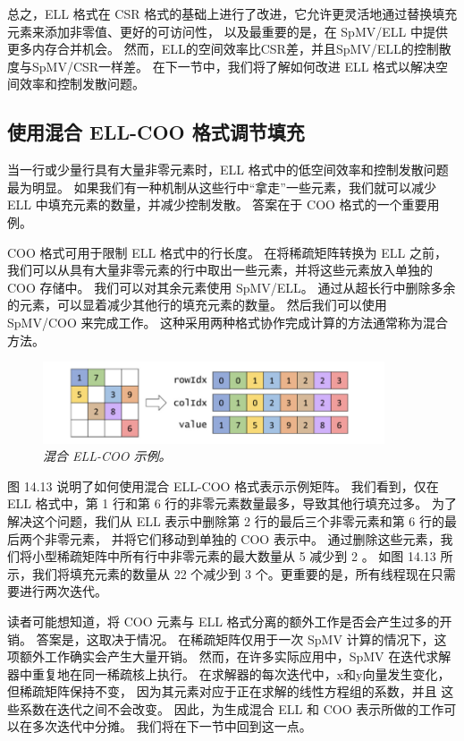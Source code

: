 总之，ELL 格式在 CSR 格式的基础上进行了改进，它允许更灵活地通过替换填充元素来添加非零值、更好的可访问性，
以及最重要的是，在 SpMV/ELL 中提供更多内存合并机会。 
然而，ELL的空间效率比CSR差，并且SpMV/ELL的控制散度与SpMV/CSR一样差。 
在下一节中，我们将了解如何改进 ELL 格式以解决空间效率和控制发散问题。

\subsection{使用混合 ELL-COO 格式调节填充}
当一行或少量行具有大量非零元素时，ELL 格式中的低空间效率和控制发散问题最为明显。 
如果我们有一种机制从这些行中“拿走”一些元素，我们就可以减少 ELL 中填充元素的数量，并减少控制发散。 
答案在于 $\mathrm{COO}$ 格式的一个重要用例。

COO 格式可用于限制 ELL 格式中的行长度。 
在将稀疏矩阵转换为 ELL 之前，我们可以从具有大量非零元素的行中取出一些元素，并将这些元素放入单独的 COO 存储中。 
我们可以对其余元素使用 SpMV/ELL。 通过从超长行中删除多余的元素，可以显着减少其他行的填充元素的数量。 
然后我们可以使用 SpMV/COO 来完成工作。 这种采用两种格式协作完成计算的方法通常称为混合方法。

\begin{figure}[H]
	\centering
	\includegraphics[width=0.9\textwidth]{figs/F14.3.png}
	\caption{\textit{混合 ELL-COO 示例。}}
\end{figure}

图 14.13 说明了如何使用混合 ELL-COO 格式表示示例矩阵。 
我们看到，仅在 ELL 格式中，第 1 行和第 6 行的非零元素数量最多，导致其他行填充过多。 
为了解决这个问题，我们从 ELL 表示中删除第 2 行的最后三个非零元素和第 6 行的最后两个非零元素，
并将它们移动到单独的 $\mathrm{COO}$ 表示中。 
通过删除这些元素，我们将小型稀疏矩阵中所有行中非零元素的最大数量从 5 减少到 2 。 
如图 14.13 所示，我们将填充元素的数量从 22 个减少到 3 个。更重要的是，所有线程现在只需要进行两次迭代。

读者可能想知道，将 COO 元素与 ELL 格式分离的额外工作是否会产生过多的开销。 答案是，这取决于情况。 
在稀疏矩阵仅用于一次 SpMV 计算的情况下，这项额外工作确实会产生大量开销。 
然而，在许多实际应用中，SpMV 在迭代求解器中重复地在同一稀疏核上执行。 
在求解器的每次迭代中，$\mathrm{x}$和$\mathrm{y}$向量发生变化，但稀疏矩阵保持不变，
因为其元素对应于正在求解的线性方程组的系数，并且 这些系数在迭代之间不会改变。 
因此，为生成混合 ELL 和 COO 表示所做的工作可以在多次迭代中分摊。 我们将在下一节中回到这一点。

